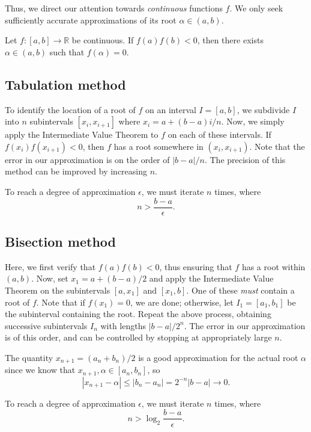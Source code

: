 \documentclass[11pt]{article}
\newcommand{\R}{\mathbb{R}}
\theoremstyle{definition}
\theoremstyle{remark}
\numberwithin{equation}{section}
\begin{document}
    Thus, we direct our attention towards \emph{continuous} functions $f$. We only
    seek sufficiently accurate approximations of its root $\alpha \in (a, b)$.

    \begin{theorem}
        Let $f\colon [a, b] \to \R$ be continuous. If $f(a) f(b) < 0$, then there
        exists $\alpha \in (a, b)$ such that $f(\alpha) = 0$.
    \end{theorem}

    \subsection{Tabulation method}
    To identify the location of a root of $f$ on an interval $I = [a, b]$, we
    subdivide $I$ into $n$ subintervals $[x_i, x_{i + 1}]$ where $x_i = a + (b - a) i
    / n$. Now, we simply apply the Intermediate Value Theorem to $f$ on each of these
    intervals. If $f(x_i) f(x_{i + 1}) < 0$, then $f$ has a root somewhere in $(x_i,
    x_{i + 1})$. Note that the error in our approximation is on the order of $|b - a|
    / n$. The precision of this method can be improved by increasing $n$.
    
    To reach a degree of approximation $\epsilon$, we must iterate $n$ times, where \[
        n > \frac{b - a}{\epsilon}.
    \] 


    \subsection{Bisection method}
    Here, we first verify that $f(a) f(b) < 0$, thus ensuring that $f$ has a root
    within $(a, b)$. Now, set $x_1 = a + (b - a) / 2$ and apply the Intermediate
    Value Theorem on the subintervals $[a, x_1]$ and $[x_1, b]$. One of these
    \emph{must} contain a root of $f$. Note that if $f(x_1) = 0$, we are done;
    otherwise, let $I_1 = [a_1, b_1]$ be the subinterval containing the root.  Repeat
    the above process, obtaining successive subintervals $I_n$ with lengths $|b - a|
    / 2^n$. The error in our approximation is of this order, and can be controlled by
    stopping at appropriately large $n$.

    The quantity $x_{n + 1} = (a_n + b_n) / 2$ is a good approximation for the actual
    root $\alpha$ since we know that $x_{n + 1}, \alpha \in [a_n, b_n]$, so \[
        |x_{n + 1} - \alpha| \leq |b_n - a_n| = 2^{-n} |b - a| \to 0.
    \] 

    To reach a degree of approximation $\epsilon$, we must iterate $n$ times, where \[
        n > \log_2{\frac{b - a}{\epsilon}}.
    \] 
\end{document}
